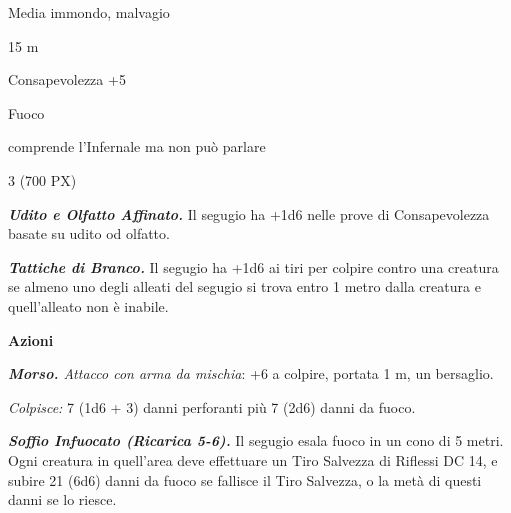 \begin{multicols}{2}
{
\begin{description}[noitemsep, topsep=0pt, parsep=0pt, partopsep=0pt, itemsep=1pt, leftmargin=2.35cm,  labelwidth=2.2cm, itemindent=0cm, listparindent=0pt] %
\setlength{\baselineskip}{10pt}
\item[\textbf{Taglia/Tipo}] Media immondo, malvagio
\item[\textbf{Caratt.}] 
\item[\textbf{Punti Ferita}] 
\item[\textbf{Movimento}] 15 m
\item[\textbf{Tiri Salvez.}] 
\item[\textbf{Comp.}] Consapevolezza +5
\item[\textbf{Imm. Danni}] Fuoco
\item[\textbf{Sensi}] 
\item[\textbf{Linguaggi}] comprende l'Infernale ma non può parlare
\item[\textbf{Sfida}] 3 (700 PX)
\end{description}
\smallskip

\emph{\textbf{Udito e Olfatto Affinato.}} Il segugio ha +1d6 nelle prove di Consapevolezza basate su udito od olfatto.

\emph{\textbf{Tattiche di Branco.}} Il segugio ha +1d6 ai tiri per colpire contro una creatura se almeno uno degli alleati del segugio si trova entro 1 metro dalla creatura e quell'alleato non è inabile.

\textbf{Azioni}

\emph{\textbf{Morso.} Attacco con arma da mischia}: +6 a colpire, portata 1 m, un bersaglio.

\emph{Colpisce:} 7 (1d6 + 3) danni perforanti più 7 (2d6) danni da fuoco.

\emph{\textbf{Soffio Infuocato (Ricarica 5-6).}} Il segugio esala fuoco in un cono di 5 metri. Ogni creatura in quell'area deve effettuare un Tiro Salvezza di Riflessi DC 14, e subire 21 (6d6) danni da fuoco se fallisce il Tiro Salvezza, o la metà di questi danni se lo riesce.

}
\end{multicols}
